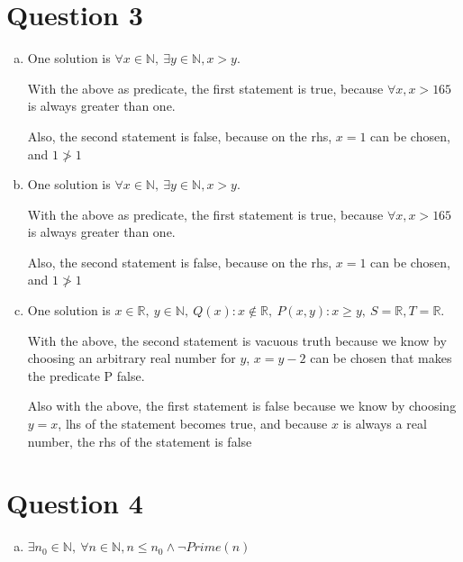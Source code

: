 \documentclass[12pt]{article}
\begin{document}
\section*{Question 3}
\begin{enumerate}[a.]
    \item

    One solution is $\forall x \in \mathbb{N},\:\exists y \in \mathbb{N}, x > y$.

    With the above as predicate, the first statement is true, because $\forall x, x > 165$ is
    always greater than one.

    Also, the second statement is false, because on the rhs, $x = 1$ can be chosen, and $1 \ngtr 1$

    \item

    One solution is $\forall x \in \mathbb{N},\:\exists y \in \mathbb{N}, x > y$.

    With the above as predicate, the first statement is true, because $\forall x, x > 165$ is
    always greater than one.

    Also, the second statement is false, because on the rhs, $x = 1$ can be chosen, and $1 \ngtr 1$

    \item

    One solution is $x \in \mathbb{R},\: y \in \mathbb{N},\:Q(x): x \notin \mathbb{R},\:P(x,y): x \geq y,\:S = \mathbb{R}, T = \mathbb{R}$.

    With the above, the second statement is vacuous truth because we know by choosing an arbitrary real number for $y$,
    $x = y - 2$ can be chosen that makes the predicate P false.

    Also with the above, the first statement is false because we know by choosing $y = x$,
    lhs of the statement becomes true, and because $x$ is always a real number, the rhs of the statement is false


\end{enumerate}

\section*{Question 4}
\begin{enumerate}[a.]
    \item

    $\exists n_0 \in \mathbb{N},\: \forall n \in \mathbb{N}, n \leq n_0 \land \neg Prime(n)$


\end{enumerate}
\end{document}
